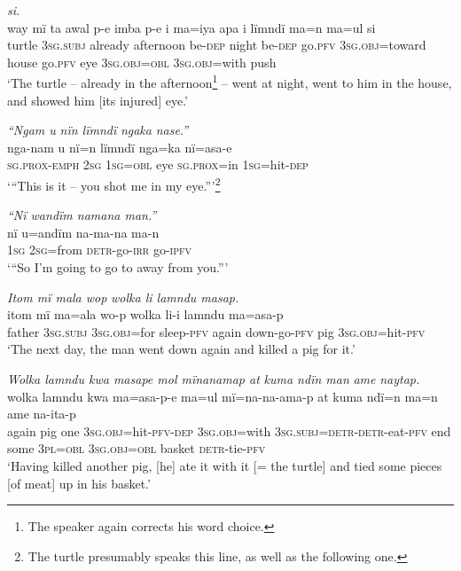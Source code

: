 \ex {} {\textit{si.}}\\
\gll way  mï      ta      awal    p-e    imba p{{}-}e    {i} ma=iya      apa {i} lïmndï  ma{=}n m{a=u}l      {si}\\
turtle  \textsc{3sg.subj}  already    afternoon  be-\textsc{dep}  night  be-\textsc{dep}  go.\textsc{pfv} 3\textsc{sg.obj=}toward  house  go.\textsc{pfv}  eye    3\textsc{sg.obj=obl}  3\textsc{sg.obj=}with  push\\
\glt ‘The turtle -- already in the afternoon\footnote{The speaker again corrects his word choice.} -- went at night, went to him in the house, and showed him [its injured] eye.’

\ex \negmedspace \textit{“Ngam u} {\textit{nïn l}}\textit{ïmndï} {\textit{ngaka}} \textit{nase.”}\\
\gll nga{{}-na}m      u    {nï=n} {l}ïmndï  {nga=ka} nï=asa-e\\
\textsc{sg.prox-emph}  \textsc{2sg}  \textsc{1sg=obl}  eye    \textsc{sg.prox=}in  \textsc{1sg=}hit-\textsc{dep}\\
\glt ‘“This is it -- you shot me in my eye.”’\footnote{The turtle presumably speaks this line, as well as the following one.}

\ex \negmedspace \textit{“Nï wand}{\textit{ï}}\textit{m namana man.”}\\
\gll nï    {u=a}nd{ï}m  na{{}-}ma{{}-}na    ma{{}-}n\\
1\textsc{sg}  2\textsc{sg=}from  \textsc{detr-}go-\textsc{irr}  go-\textsc{ipfv}\\
\glt ‘“So {I’m going to go to away from you.”}’

\ex \negmedspace \textit{Itom mï mala wo}{\textit{p}} \textit{wolka li lamndu masap.}\\
\gll itom  mï      ma=ala    wo-{p} wolka  li-i lamndu ma=as{a-}p\\
father  3\textsc{sg.subj}  3\textsc{sg.obj=}for  sleep-\textsc{pfv}  again  down-go-\textsc{pfv}  pig 3\textsc{sg.obj}=hit-\textsc{pfv}\\
\glt ‘The next day, the man went down again and killed a pig for it.’

\newpage

\ex \negmedspace \textit{Wolka lamndu kwa masape mol mïnanamap a}{\textit{t}} \textit{kuma ndïn man} {\textit{ame}} \textit{naytap.}\\
\gll wolka  lamndu  kwa  ma=asa-p{{}-}e      m{a=u}l mï{=}na{{}-}na{}-am{a-}p          a{t} kuma  ndï={n} ma=n ame		na-ita-p\\
again  pig      one    3\textsc{sg.obj}=hit-\textsc{pfv-dep}  3\textsc{sg.obj}=with 3\textsc{sg.subj=detr-detr-}eat-\textsc{pfv}  end    some  \textsc{3pl=obl}  \textsc{3sg.obj=obl} basket  \textsc{detr-}tie-\textsc{pfv}\\
\glt ‘{Having killed another pig, [he] ate it with it [= the turtle]} and tied some pieces [of meat] up in his {basket}.’

